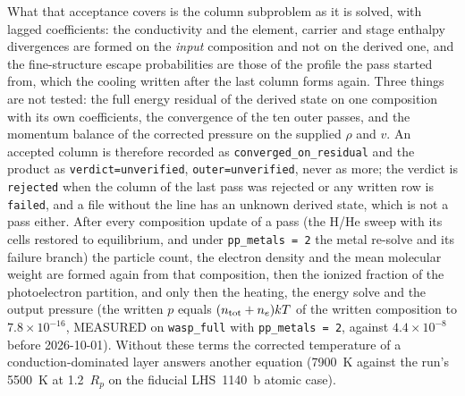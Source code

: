 What that acceptance covers is the column subproblem as it is solved, with
lagged coefficients: the conductivity and the element, carrier and stage
enthalpy divergences are formed on the \emph{input} composition and not on the
derived one, and the fine-structure escape probabilities are those of the
profile the pass started from, which the cooling written after the last
column forms again.  Three things are not tested: the full energy residual
of the derived state on one composition with its own coefficients, the
convergence of the ten outer passes, and the momentum balance of the
corrected pressure on the supplied $\rho$ and $v$.  An accepted column is
therefore recorded as \texttt{converged\_on\_residual} and the product as
\texttt{verdict=unverified}, \texttt{outer=unverified}, never as more; the
verdict is \texttt{rejected} when the column of the last pass was rejected
or any written row is \texttt{failed}, and a file without the line has an
unknown derived state, which is not a pass either.  After every
composition update of a pass (the H/He sweep with its cells restored to
equilibrium, and under \texttt{pp\_metals = 2} the metal re-solve and its
failure branch) the particle count, the electron density and the mean
molecular weight are formed again from that composition, then the ionized
fraction of the photoelectron partition, and only then the heating, the
energy solve and the output pressure (the written $p$ equals
$(n_{\rm tot}+n_e)kT$ of the written composition to $7.8\times10^{-16}$,
MEASURED on \texttt{wasp\_full} with \texttt{pp\_metals = 2}, against
$4.4\times10^{-8}$ before 2026-10-01).  Without these terms
the corrected temperature of a conduction-dominated layer answers another
equation (7900~K against the run's 5500~K at 1.2~$R_p$ on the fiducial
LHS~1140~b atomic case).

